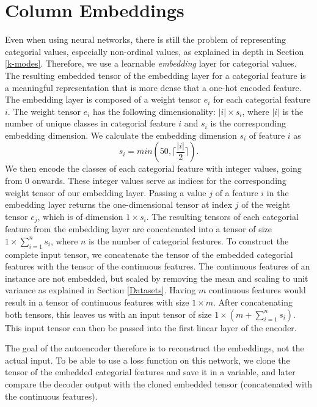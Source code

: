 \section{Column Embeddings}

Even when using neural networks, there is still the problem of representing categorial values, especially non-ordinal values, as explained in depth in Section \ref{k-modes}. Therefore, we use a learnable \textit{embedding} layer for categorial values. The resulting embedded tensor of the embedding layer for a categorial feature is a meaningful representation that is more dense that a one-hot encoded feature. The embedding layer is composed of a weight tensor $e_i$ for each categorial feature $i$. The weight tensor $e_i$  has the following dimensionality: $|i| \times s_i$, where $|i|$ is the number of unique classes in categorial feature $i$ and $s_i$ is the corresponding embedding dimension. We calculate the embedding dimension $s_i$ of feature $i$ as
$$s_i = min(50, \lceil \frac{|i|}{2} \rceil).$$
We then encode the classes of each categorial feature with integer values, going from 0 onwards. These integer values serve as indices for the corresponding weight tensor of our embedding layer. Passing a value $j$ of a feature $i$ in the embedding layer returns the one-dimensional tensor at index $j$ of the weight tensor $e_j$, which is of dimension $1 \times s_i$. The resulting tensors of each categorial feature from the embedding layer are concatenated into a tensor of size $1 \times \sum^n_{i=1}s_i$, where $n$ is the number of categorial features. To construct the complete input tensor, we concatenate the tensor of the embedded categorial features with the tensor of the continuous features. The continuous features of an instance are not embedded, but scaled by removing the mean and scaling to unit variance as explained in Section \ref{Datasets}. Having $m$ continuous features would result in a tensor of continuous features with size $1 \times m$. After concatenating both tensors, this leaves us with an input tensor of size $1 \times (m + \sum^n_{i=1}s_i)$. This input tensor can then be passed into the first linear layer of the encoder.

The goal of the autoencoder therefore is to reconstruct the embeddings, not the actual input. To be able to use a loss function on this network, we clone the tensor of the embedded categorial features and save it in a variable, and later compare the decoder output with the cloned embedded tensor (concatenated with the continuous features).

